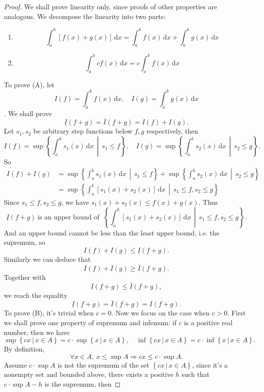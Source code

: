 \documentclass[a4paper]{ctexart}
\begin{document}
	\begin{proof}
		We shall prove linearity only, since proofs of other properties are analogous. We decompose the linearity into two parts:
		\begin{enumerate}
			\item[(A)] \[ \int_a^b\left[f(x)+g(x)\right]\,\mathrm{d}x=\int_a^b f(x)\,\mathrm{d}x + \int_a^b g(x)\,\mathrm{d}x
			\]
			\item[(B)] \[\int_a^b cf(x)\,\mathrm{d}x=c\int_a^b f(x)\,\mathrm{d}x\]
		\end{enumerate}
		To prove (A), let
		\[
		I(f)=\int_a^b f(x)\,\mathrm{d}x,\quad 
		I(g)=\int_a^b g(x)\,\mathrm{d}x
		\].
		We shall prove
		\[
		\underline{I}(f+g) = \overline{I}(f+g) = I(f)+I(g).
		\]
		Let $s_1,s_2$ be arbitrary step functions below $f,g$ respectively, then
		\[
		I(f)=\sup \left\{ \int_a^b s_1(x)\,\mathrm{d}x \,\middle|\, s_1\le f\right\},\quad
		I(g)=\sup \left\{ \int_a^b s_2(x)\, \mathrm{d}x \,\middle|\, s_2\le g\right\}.
		\]
		So
		\[
		\begin{aligned}
			I(f)+I(g)
			&=\sup \left\{ \int_a^b s_1(x)\,\mathrm{d}x \,\middle|\, s_1\le f\right\} +
			\sup \left\{ \int_a^b s_2(x)\, \mathrm{d}x \,\middle|\, s_2\le g\right\}\\[6pt]
			&=\sup \left\{\int_a^b \left[s_1(x)+s_2(x)\right]\,\mathrm{d}x\,\middle|\,s_1\le f,s_2\le g \right\}
		\end{aligned}
		\]
		Since $s_1\le f, s_2\le g$, we have $s_1(x)+s_2(x) \le f(x)+g(x)$. Thus
		\[
		\underline{I}(f+g)\ \text{is an upper bound of }\ 
		\left\{\int_a^b \left[s_1(x)+s_2(x)\right]\,\mathrm{d}x\,\middle|\,s_1\le f,s_2\le g \right\}.
		\]
		And an upper bound cannot be less than the least upper bound, i.e. the supremum, so
		\[
		I(f)+I(g) \le \underline{I}(f+g).
		\]
		Similarly we can deduce that
		\[
		I(f)+I(g) \ge \overline{I}(f+g).
		\]
		Together with 
		\[
		\underline{I}(f+g) \le \overline{I}(f+g),
		\]
		we reach the equality
		\[
		\underline{I}(f+g) = \overline{I}(f+g) = I(f+g).
		\]
		To prove (B), it's trivial when $c=0$. Now we focus on the case when $c>0$. First we shall prove one property of supremum and infemum: if $c$ is a positive real number, then we have
		\[
		\sup\left\{cx\,|\,x\in A \right\} = c\cdot\sup\left\{ x\,|\,x\in A\right\},
		\quad \inf \left\{cx\,|\,x\in A \right\} = c\cdot\inf \left\{ x\,|\,x\in A\right\}.
		\]
		By definition,
		\[
		\forall x \in A,\ x\le \sup A \Rightarrow cx\le c\cdot \sup A.
		\]
		Assume $c\cdot \sup A$ is not the supremum of the set $\left\{cx\,|\,x\in A \right\}$, since it's a nonempty set and bounded above, there exists a positive $h$ such that $c\cdot \sup A-h$ is the supremum, then

\end{proof}
\end{document}
